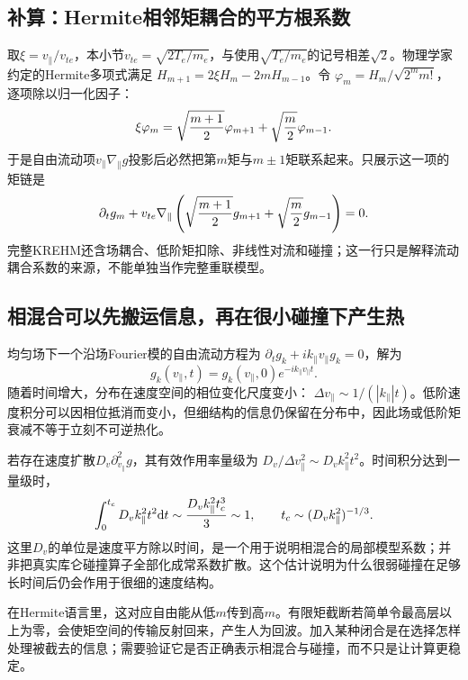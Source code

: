 \subsection{补算：Hermite相邻矩耦合的平方根系数}
取$\xi=v_\parallel/v_{te}$，本小节$v_{te}=\sqrt{2T_e/m_e}$，与使用$\sqrt{T_e/m_e}$的记号相差$\sqrt2$。物理学家约定的Hermite多项式满足
$H_{m+1}=2\xi H_m-2mH_{m-1}$。令
$\varphi_m=H_m/\sqrt{2^m m!}$，逐项除以归一化因子：
\begin{equation}
 \xi\varphi_m=
 \sqrt{{m+1\over2}}\varphi_{m+1}
 +\sqrt{{m\over2}}\varphi_{m-1}.
\end{equation}
于是自由流动项$v_\parallel\nabla_\parallel g$投影后必然把第$m$矩与$m\pm1$矩联系起来。只展示这一项的矩链是
\begin{equation}
 \partial_tg_m+
 v_{te}\nabla_\parallel
 \left(\sqrt{{m+1\over2}}g_{m+1}
       +\sqrt{{m\over2}}g_{m-1}\right)=0.
\end{equation}
完整KREHM还含场耦合、低阶矩扣除、非线性对流和碰撞；这一行只是解释流动耦合系数的来源，不能单独当作完整重联模型。

\subsection{相混合可以先搬运信息，再在很小碰撞下产生热}
均匀场下一个沿场Fourier模的自由流动方程为
$\partial_tg_k+ik_\parallel v_\parallel g_k=0$，解为
\begin{equation}
 g_k(v_\parallel,t)=g_k(v_\parallel,0)
 e^{-ik_\parallel v_\parallel t}.
\end{equation}
随着时间增大，分布在速度空间的相位变化尺度变小：
$\Delta v_\parallel\sim1/(|k_\parallel|t)$。低阶速度积分可以因相位抵消而变小，但细结构的信息仍保留在分布中，因此场或低阶矩衰减不等于立刻不可逆热化。

若存在速度扩散$D_v\partial_{v_\parallel}^2g$，其有效作用率量级为
$D_v/\Delta v_\parallel^2\sim D_vk_\parallel^2t^2$。时间积分达到一量级时，
\begin{equation}
 \int_0^{t_c}D_vk_\parallel^2t^2\mathrm d t
 \sim{D_vk_\parallel^2t_c^3\over3}\sim1,
 \qquad t_c\sim(D_vk_\parallel^2)^{-1/3}.
\end{equation}
这里$D_v$的单位是速度平方除以时间，是一个用于说明相混合的局部模型系数；并非把真实库仑碰撞算子全部化成常系数扩散。这个估计说明为什么很弱碰撞在足够长时间后仍会作用于很细的速度结构。

在Hermite语言里，这对应自由能从低$m$传到高$m$。有限矩截断若简单令最高层以上为零，会使矩空间的传输反射回来，产生人为回波。加入某种闭合是在选择怎样处理被截去的信息；需要验证它是否正确表示相混合与碰撞，而不只是让计算更稳定。
